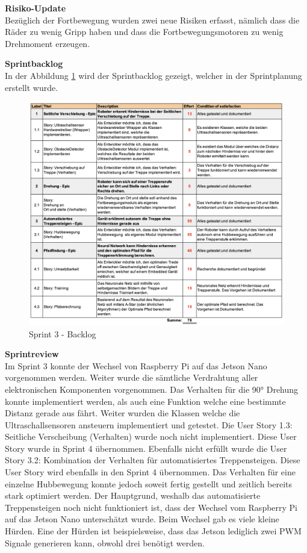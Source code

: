 \textbf{Risiko-Update}\\
Bezüglich der Fortbewegung wurden zwei neue Risiken erfasst, nämlich dass die Räder zu wenig Gripp haben und dass die Fortbewegungsmotoren zu wenig Drehmoment erzeugen.

\textbf{Sprintbacklog}\\
In der Abbildung \ref{fig:sprint-backlog-3} wird der Sprintbacklog gezeigt, welcher in der Sprintplanung erstellt wurde.
\begin{figure}[H]
  \includegraphics[width=1.0\textwidth]{img/projektmanagement/Sprint 3.png}
  \centering
  \caption{Sprint 3 - Backlog}
  \label{fig:sprint-backlog-3}
\end{figure}

\newpage

\textbf{Sprintreview}\\
Im Sprint 3 konnte der Wechsel von Raspberry Pi auf das Jetson Nano vorgenommen werden. Weiter wurde die sämtliche Verdrahtung aller elektronischen Komponenten vorgenommen. Das Verhalten für die 90° Drehung konnte implementiert werden, als auch eine Funktion welche eine bestimmte Distanz gerade aus fährt. Weiter wurden die Klassen welche die Ultraschallsensoren ansteuern implementiert und getestet. Die User Story 1.3: Seitliche Verscheibung (Verhalten) wurde noch nicht implementiert. Diese User Story wurde in Sprint 4 übernommen. Ebenfalls nicht erfüllt wurde die User Story 3.2: Kombination der Verhalten für automatisiertes Treppensteigen. Diese User Story wird ebenfalls in den Sprint 4 übernommen. Das Verhalten für eine einzelne Hubbewegung konnte jedoch soweit fertig gestellt und zeitlich bereits stark optimiert werden. Der Hauptgrund, weshalb das automatisierte Treppensteigen noch nicht funktioniert ist, dass der Wechsel vom Raspberry Pi auf das Jetson Nano unterschätzt wurde. Beim Wechsel gab es viele kleine Hürden. Eine der Hürden ist beispielsweise, dass das Jetson lediglich zwei PWM Signale generieren kann, obwohl drei benötigt werden.

